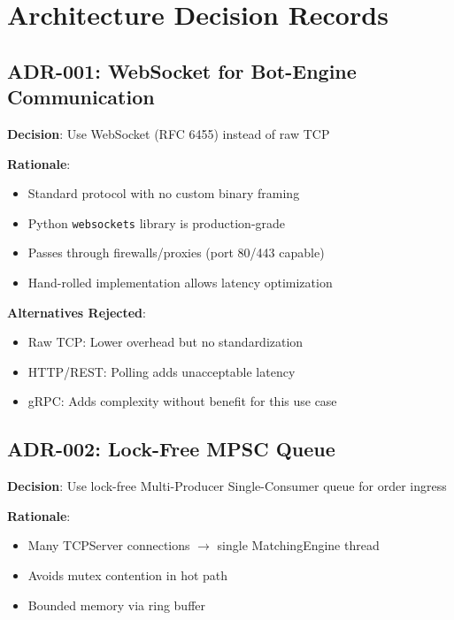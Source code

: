 \documentclass[10pt,a4paper,oneside]{report}
\begin{document}
\chapter{Architecture Decision Records}

\section{ADR-001: WebSocket for Bot-Engine Communication}

\textbf{Decision}: Use WebSocket (RFC 6455) instead of raw TCP

\textbf{Rationale}:
\begin{itemize}
    \item Standard protocol with no custom binary framing
    \item Python \texttt{websockets} library is production-grade
    \item Passes through firewalls/proxies (port 80/443 capable)
    \item Hand-rolled implementation allows latency optimization
\end{itemize}

\textbf{Alternatives Rejected}:
\begin{itemize}
    \item Raw TCP: Lower overhead but no standardization
    \item HTTP/REST: Polling adds unacceptable latency
    \item gRPC: Adds complexity without benefit for this use case
\end{itemize}

\section{ADR-002: Lock-Free MPSC Queue}

\textbf{Decision}: Use lock-free Multi-Producer Single-Consumer queue for order ingress

\textbf{Rationale}:
\begin{itemize}
    \item Many TCPServer connections $\rightarrow$ single MatchingEngine thread
    \item Avoids mutex contention in hot path
    \item Bounded memory via ring buffer
\end{itemize}
\end{document}

